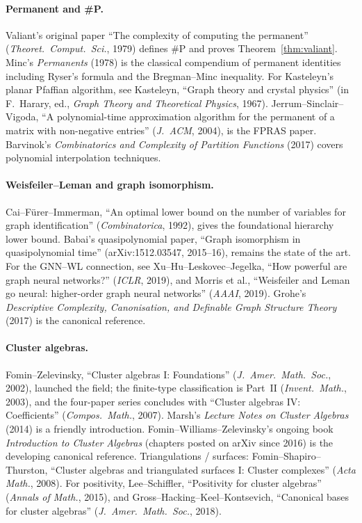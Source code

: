 \paragraph{Permanent and \#P.} Valiant's original paper
``The complexity of computing the permanent'' (\emph{Theoret.\ Comput.\ Sci.},
1979) defines \#P and proves Theorem~\ref{thm:valiant}. Minc's
\emph{Permanents} (1978) is the classical compendium of
permanent identities including Ryser's formula and the Bregman--Minc
inequality. For Kasteleyn's planar Pfaffian algorithm, see
Kasteleyn, ``Graph theory and crystal physics'' (in F.\ Harary, ed.,
\emph{Graph Theory and Theoretical Physics}, 1967). Jerrum--Sinclair--Vigoda,
``A polynomial-time approximation algorithm for the permanent of a
matrix with non-negative entries'' (\emph{J.\ ACM}, 2004), is the
FPRAS paper. Barvinok's \emph{Combinatorics and Complexity of
Partition Functions} (2017) covers polynomial interpolation
techniques.

\paragraph{Weisfeiler--Leman and graph isomorphism.} Cai--F\"urer--Immerman,
``An optimal lower bound on the number of variables for graph
identification'' (\emph{Combinatorica}, 1992), gives the foundational
hierarchy lower bound. Babai's quasipolynomial paper, ``Graph
isomorphism in quasipolynomial time'' (arXiv:1512.03547, 2015--16),
remains the state of the art. For the GNN--WL connection, see
Xu--Hu--Leskovec--Jegelka, ``How powerful are graph neural networks?''
(\emph{ICLR}, 2019), and Morris et al., ``Weisfeiler and Leman go
neural: higher-order graph neural networks'' (\emph{AAAI}, 2019).
Grohe's \emph{Descriptive Complexity, Canonisation, and Definable
Graph Structure Theory} (2017) is the canonical reference.

\paragraph{Cluster algebras.} Fomin--Zelevinsky,
``Cluster algebras I: Foundations'' (\emph{J.\ Amer.\ Math.\ Soc.},
2002), launched the field; the finite-type classification is Part~II
(\emph{Invent.\ Math.}, 2003), and the four-paper series concludes
with ``Cluster algebras IV: Coefficients'' (\emph{Compos.\ Math.},
2007). Marsh's \emph{Lecture Notes on Cluster
Algebras} (2014) is a friendly introduction. Fomin--Williams--Zelevinsky's
ongoing book \emph{Introduction to Cluster Algebras} (chapters posted
on arXiv since 2016) is the developing canonical reference.
Triangulations / surfaces: Fomin--Shapiro--Thurston,
``Cluster algebras and triangulated surfaces I: Cluster complexes''
(\emph{Acta Math.}, 2008). For positivity, Lee--Schiffler,
``Positivity for cluster algebras'' (\emph{Annals of Math.}, 2015),
and Gross--Hacking--Keel--Kontsevich,
``Canonical bases for cluster algebras'' (\emph{J.\ Amer.\ Math.\ Soc.},
2018).

